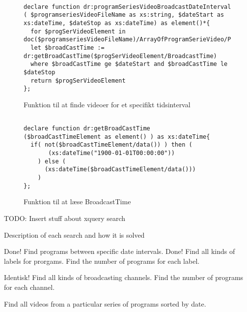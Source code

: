 \begin{figure}[ht]
\begin{lstlisting}[style=FAKE_XQUERY, language=XQUERY]

declare function dr:programSeriesVideoBroadcastDateInterval
( $programseriesVideoFileName as xs:string, $dateStart as xs:dateTime, $dateStop as xs:dateTime) as element()*{
  for $progSerVideoElement in doc($programseriesVideoFileName)/ArrayOfProgramSerieVideo/ProgramSerieVideo
  let $broadCastTime := dr:getBroadCastTime($progSerVideoElement/BroadcastTime)
  where $broadCastTime ge $dateStart and $broadCastTime le $dateStop
  return $progSerVideoElement
}; 

\end{lstlisting}
\caption{Funktion til at finde videoer for et specifikt tidsinterval}
\label{xquerySearch:programSeriesVideoBroadcastDateInterval}
\end{figure}



\begin{figure}[ht]
\begin{lstlisting}[style=FAKE_XQUERY, language=XQUERY]

declare function dr:getBroadCastTime
($broadCastTimeElement as element() ) as xs:dateTime{
  if( not($broadCastTimeElement/data()) ) then (
       (xs:dateTime("1900-01-01T00:00:00"))
    ) else (
      (xs:dateTime($broadCastTimeElement/data()))
    ) 
};

\end{lstlisting}
\caption{Funktion til at læse BroadcastTime}
\label{xquerySearch:getBroadCastTime}
\end{figure}





TODO: Insert stuff about xquery search

Description of each search and how it is solved

Done! Find programs between specific date intervals.
Done! Find all kinds of labels for prorgams.
Find the number of programs for each label.

Identisk! Find all kinds of broadcasting channels.
Find the number of programs for each channel.

Find all videos from a particular series of programs sorted by date.



